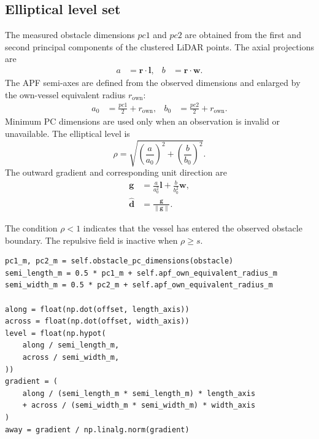 \documentclass[11pt,a4paper]{article}
\begin{document}
\subsection{Elliptical level set}

The measured obstacle dimensions $pc1$ and $pc2$ are obtained from the first
and second principal components of the clustered LiDAR points. The axial
projections are
\begin{equation}
\begin{aligned}
a &= \bm{r}\cdot\bm{l}, &
b &= \bm{r}\cdot\bm{w}.
\end{aligned}
\end{equation}
The APF semi-axes are defined from the observed dimensions and enlarged by
the own-vessel equivalent radius $r_{\mathrm{own}}$:
\begin{equation}
\begin{aligned}
a_0 &= \frac{pc1}{2}+r_{\mathrm{own}}, &
b_0 &= \frac{pc2}{2}+r_{\mathrm{own}}.
\end{aligned}
\end{equation}
Minimum PC dimensions are used only when an observation is invalid or unavailable.
The elliptical level is
\begin{equation}
\rho=\sqrt{\left(\frac{a}{a_0}\right)^2+
\left(\frac{b}{b_0}\right)^2}.
\end{equation}
The outward gradient and corresponding unit direction are
\begin{align}
\bm{g}&=\frac{a}{a_0^2}\bm{l}+\frac{b}{b_0^2}\bm{w},\\
\hat{\bm{d}}&=\frac{\bm{g}}{\lVert\bm{g}\rVert}.
\end{align}

The condition $\rho<1$ indicates that the vessel has entered the observed
obstacle boundary. The repulsive field is inactive when $\rho\geq s$.

\begin{lstlisting}
pc1_m, pc2_m = self.obstacle_pc_dimensions(obstacle)
semi_length_m = 0.5 * pc1_m + self.apf_own_equivalent_radius_m
semi_width_m = 0.5 * pc2_m + self.apf_own_equivalent_radius_m

along = float(np.dot(offset, length_axis))
across = float(np.dot(offset, width_axis))
level = float(np.hypot(
    along / semi_length_m,
    across / semi_width_m,
))
gradient = (
    along / (semi_length_m * semi_length_m) * length_axis
    + across / (semi_width_m * semi_width_m) * width_axis
)
away = gradient / np.linalg.norm(gradient)
\end{lstlisting}
\end{document}
